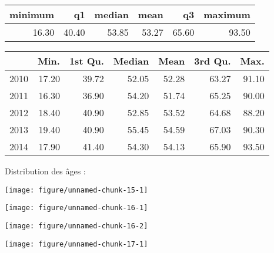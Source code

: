 \documentclass[11pt,a4paper]{article}\usepackage[]{graphicx}\usepackage[]{color}
\makeatletter
\def\maxwidth{ %
  \ifdim\Gin@nat@width>\linewidth
    \linewidth
  \else
    \Gin@nat@width
  \fi
}
\newenvironment{knitrout}{}{} %
\makeatother
\begin{document}
\begin{table}[ht]
\centering
\begin{tabular}{rrrrrr}
  \hline
minimum & q1 & median & mean & q3 & maximum \\ 
  \hline
16.30 & 40.40 & 53.85 & 53.27 & 65.60 & 93.50 \\ 
   \hline
\end{tabular}
\end{table}
\begin{table}[H]
\centering
\begin{tabular}{rrrrrrr}
  \hline
 & Min. & 1st Qu. & Median & Mean & 3rd Qu. & Max. \\ 
  \hline
2010 & 17.20 & 39.72 & 52.05 & 52.28 & 63.27 & 91.10 \\ 
  2011 & 16.30 & 36.90 & 54.20 & 51.74 & 65.25 & 90.00 \\ 
  2012 & 18.40 & 40.90 & 52.85 & 53.52 & 64.68 & 88.20 \\ 
  2013 & 19.40 & 40.90 & 55.45 & 54.59 & 67.03 & 90.30 \\ 
  2014 & 17.90 & 41.40 & 54.30 & 54.13 & 65.90 & 93.50 \\ 
   \hline
\end{tabular}
\end{table}


Distribution des âges :

\begin{knitrout}
\color{fgcolor}
\texttt{[image: figure/unnamed-chunk-15-1]} 

\end{knitrout}

\begin{knitrout}
\color{fgcolor}
\texttt{[image: figure/unnamed-chunk-16-1]} 

\texttt{[image: figure/unnamed-chunk-16-2]} 

\end{knitrout}

\begin{knitrout}
\color{fgcolor}
\texttt{[image: figure/unnamed-chunk-17-1]} 

\end{knitrout}
\end{document}
